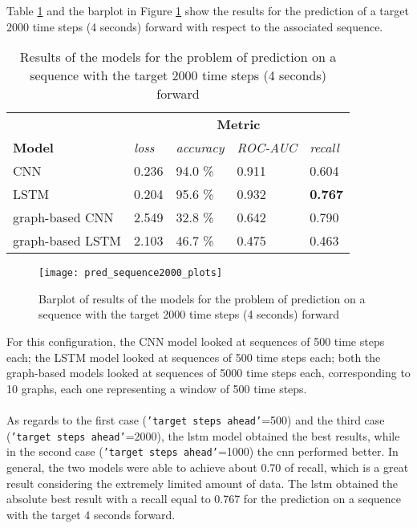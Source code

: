 Table \ref{tab:pred_sequence2000_results} and the barplot in Figure \ref{fig:pred_sequence2000_plots} show the results for the prediction of a target 2000 time steps (4 seconds) forward with respect to the associated sequence.
\newpage
\begin{table}[htbp]
    \centering
    \begin{tabular}{lllll}
        \hline
                          & \multicolumn{4}{c}{\textbf{Metric}}                                    \\ \cline{2-5} 
        \textbf{Model}    & \textit{loss} & \textit{accuracy} & \textit{ROC-AUC} & \textit{recall} \\ \hline
        CNN               & 0.236         & 94.0 \%           & 0.911            & 0.604           \\
        LSTM              & 0.204         & 95.6 \%           & 0.932            & \textbf{0.767}  \\
        graph-based CNN   & 2.549         & 32.8 \%           & 0.642            & 0.790           \\
        graph-based LSTM  & 2.103         & 46.7 \%           & 0.475            & 0.463           \\\hline
    \end{tabular}
    \caption{Results of the models for the problem of prediction on a sequence with the target 2000 time steps (4 seconds) forward}
    \label{tab:pred_sequence2000_results}
\end{table}

\begin{figure}[htbp]
    \centering
    \texttt{[image: pred\_sequence2000\_plots]}
    \caption{Barplot of results of the models for the problem of prediction on a sequence with the target 2000 time steps (4 seconds) forward}
    \label{fig:pred_sequence2000_plots}
\end{figure}

For this configuration, the CNN model looked at sequences of 500 time steps each; the LSTM model looked at sequences of 500 time steps each; both the graph-based models looked at sequences of 5000 time steps each, corresponding to 10 graphs, each one representing a window of 500 time steps.

\paragraph{} As regards to the first case (\texttt{'target steps ahead'}=500) and the third case (\texttt{'target steps ahead'}=2000), the \acs{lstm} model obtained the best results, while in the second case (\texttt{'target steps ahead'}=1000) the \acs{cnn} performed better. In general, the two models were able to achieve about 0.70 of recall, which is a great result considering the extremely limited amount of data. The \acs{lstm} obtained the absolute best result with a recall equal to 0.767 for the prediction on a sequence with the target 4 seconds forward.

